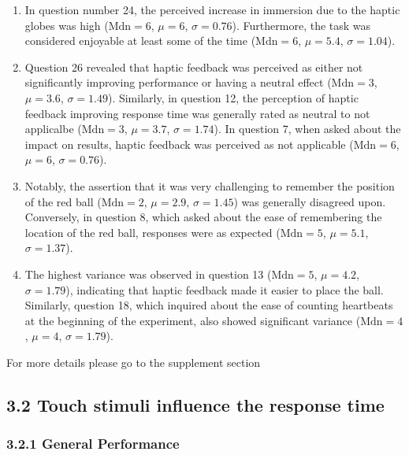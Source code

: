 \documentclass[12pt,oneside,openright]{report}
\begin{document}
    \begin{enumerate}
        \item In question number 24, the perceived increase in immersion due to the haptic globes was high ($\text{Mdn} = 6$, $\mu = 6$, $\sigma = 0.76$). Furthermore, the task was considered enjoyable at least some of the time ($\text{Mdn} = 6$, $\mu = 5.4$, $\sigma = 1.04$).
        
        \item Question 26 revealed that haptic feedback was perceived as either not significantly improving performance or having a neutral effect ($\text{Mdn} = 3$, $\mu = 3.6$, $\sigma = 1.49$). Similarly, in question 12, the perception of haptic feedback improving response time was generally rated as neutral to not applicalbe ($\text{Mdn} = 3$, $\mu = 3.7$, $\sigma = 1.74$). In question 7, when asked about the impact on results, haptic feedback was perceived as not applicable ($\text{Mdn} = 6$, $\mu = 6$, $\sigma = 0.76$).
    
        \item Notably, the assertion that it was very challenging to remember the position of the red ball ($\text{Mdn} = 2$, $\mu = 2.9$, $\sigma = 1.45$) was generally disagreed upon. Conversely, in question 8, which asked about the ease of remembering the location of the red ball, responses were as expected ($\text{Mdn} = 5$, $\mu = 5.1$, $\sigma = 1.37$).
    
        \item The highest variance was observed in question 13 ($\text{Mdn} = 5$, $\mu = 4.2$, $\sigma = 1.79$), indicating that haptic feedback made it easier to place the ball. Similarly, question 18, which inquired about the ease of counting heartbeats at the beginning of the experiment, also showed significant variance ($\text{Mdn} = 4$, $\mu = 4$, $\sigma = 1.79$). 
        
    \end{enumerate}
    
    For more details please go to the supplement section 

    
\subsection*{3.2 Touch stimuli influence the response time}
\subsubsection*{3.2.1 General Performance}
\end{document}
